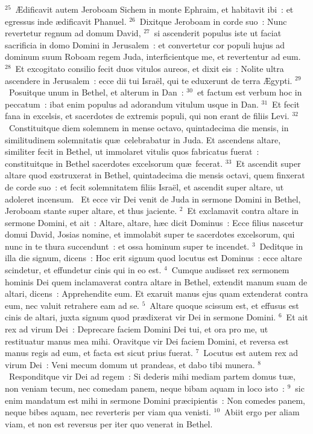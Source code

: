 ${}^{25}$~\AE dificavit autem Jeroboam Sichem in monte Ephraim, et habitavit ibi~: et egressus inde \ae dificavit Phanuel.
${}^{26}$~Dixitque Jeroboam in corde suo~: Nunc revertetur regnum ad domum David,
${}^{27}$~si ascenderit populus iste ut faciat sacrificia in domo Domini in Jerusalem~: et convertetur cor populi hujus ad dominum suum Roboam regem Juda, interficientque me, et revertentur ad eum.
${}^{28}$~Et excogitato consilio fecit duos vitulos aureos, et dixit eis~: Nolite ultra ascendere in Jerusalem~: ecce dii tui Isra\"el, qui te eduxerunt de terra \AE gypti.
${}^{29}$~Posuitque unum in Bethel, et alterum in Dan~:
${}^{30}$~et factum est verbum hoc in peccatum~: ibat enim populus ad adorandum vitulum usque in Dan.
${}^{31}$~Et fecit fana in excelsis, et sacerdotes de extremis populi, qui non erant de filiis Levi.
${}^{32}$~Constituitque diem solemnem in mense octavo, quintadecima die mensis, in similitudinem solemnitatis qu\ae\ celebrabatur in Juda. Et ascendens altare, similiter fecit in Bethel, ut immolaret vitulis quos fabricatus fuerat~: constituitque in Bethel sacerdotes excelsorum qu\ae\ fecerat.
${}^{33}$~Et ascendit super altare quod exstruxerat in Bethel, quintadecima die mensis octavi, quem finxerat de corde suo~: et fecit solemnitatem filiis Isra\"el, et ascendit super altare, ut adoleret incensum.
~\lettrine[lines=10,image=true,loversize=0.05,lraise=-0.03]{E}{}t ecce vir Dei venit de Juda in sermone Domini in Bethel, Jeroboam stante super altare, et thus jaciente.
${}^{2}$~Et exclamavit contra altare in sermone Domini, et ait~: Altare, altare, h\ae c dicit Dominus~: Ecce filius nascetur domui David, Josias nomine, et immolabit super te sacerdotes excelsorum, qui nunc in te thura succendunt~: et ossa hominum super te incendet.
${}^{3}$~Deditque in illa die signum, dicens~: Hoc erit signum quod locutus est Dominus~: ecce altare scindetur, et effundetur cinis qui in eo est.
${}^{4}$~Cumque audisset rex sermonem hominis Dei quem inclamaverat contra altare in Bethel, extendit manum suam de altari, dicens~: Apprehendite eum. Et exaruit manus ejus quam extenderat contra eum, nec valuit retrahere eam ad se.
${}^{5}$~Altare quoque scissum est, et effusus est cinis de altari, juxta signum quod pr\ae dixerat vir Dei in sermone Domini.
${}^{6}$~Et ait rex ad virum Dei~: Deprecare faciem Domini Dei tui, et ora pro me, ut restituatur manus mea mihi. Oravitque vir Dei faciem Domini, et reversa est manus regis ad eum, et facta est sicut prius fuerat.
${}^{7}$~Locutus est autem rex ad virum Dei~: Veni mecum domum ut prandeas, et dabo tibi munera.
${}^{8}$~Responditque vir Dei ad regem~: Si dederis mihi mediam partem domus tu\ae , non veniam tecum, nec comedam panem, neque bibam aquam in loco isto~:
${}^{9}$~sic enim mandatum est mihi in sermone Domini pr\ae cipientis~: Non comedes panem, neque bibes aquam, nec reverteris per viam qua venisti.
${}^{10}$~Abiit ergo per aliam viam, et non est reversus per iter quo venerat in Bethel.


